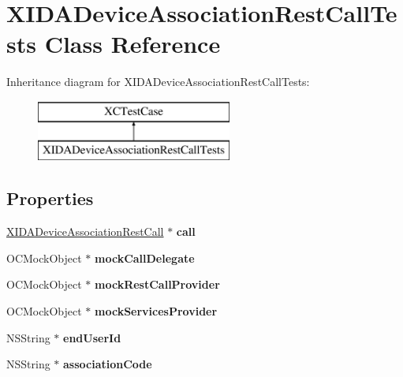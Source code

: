 \hypertarget{interface_x_i_d_a_device_association_rest_call_tests}{}\section{X\+I\+D\+A\+Device\+Association\+Rest\+Call\+Tests Class Reference}
\label{interface_x_i_d_a_device_association_rest_call_tests}
Inheritance diagram for X\+I\+D\+A\+Device\+Association\+Rest\+Call\+Tests\+:\begin{figure}[H]
\begin{center}
\leavevmode
\includegraphics[height=2.000000cm]{interface_x_i_d_a_device_association_rest_call_tests}
\end{center}
\end{figure}
\subsection*{Properties}
\begin{DoxyCompactItemize}
\item 
\hypertarget{interface_x_i_d_a_device_association_rest_call_tests_ac5ecd37ae1725d9f8649760bc7f407dc}{}\label{interface_x_i_d_a_device_association_rest_call_tests_ac5ecd37ae1725d9f8649760bc7f407dc} 
\hyperlink{interface_x_i_d_a_device_association_rest_call}{X\+I\+D\+A\+Device\+Association\+Rest\+Call} $\ast$ {\bfseries call}
\item 
\hypertarget{interface_x_i_d_a_device_association_rest_call_tests_a757dd87dff3ae3c88734c4844ad99baa}{}\label{interface_x_i_d_a_device_association_rest_call_tests_a757dd87dff3ae3c88734c4844ad99baa} 
O\+C\+Mock\+Object $\ast$ {\bfseries mock\+Call\+Delegate}
\item 
\hypertarget{interface_x_i_d_a_device_association_rest_call_tests_aae3626fd59d1564563d21fe7a61479f0}{}\label{interface_x_i_d_a_device_association_rest_call_tests_aae3626fd59d1564563d21fe7a61479f0} 
O\+C\+Mock\+Object $\ast$ {\bfseries mock\+Rest\+Call\+Provider}
\item 
\hypertarget{interface_x_i_d_a_device_association_rest_call_tests_a58858ed996bc636ff948498c8ac4beb5}{}\label{interface_x_i_d_a_device_association_rest_call_tests_a58858ed996bc636ff948498c8ac4beb5} 
O\+C\+Mock\+Object $\ast$ {\bfseries mock\+Services\+Provider}
\item 
\hypertarget{interface_x_i_d_a_device_association_rest_call_tests_aea2d0434672cae9152e4a18734f39d34}{}\label{interface_x_i_d_a_device_association_rest_call_tests_aea2d0434672cae9152e4a18734f39d34} 
N\+S\+String $\ast$ {\bfseries end\+User\+Id}
\item 
\hypertarget{interface_x_i_d_a_device_association_rest_call_tests_aada66b75d15aa37ef1df9db5455c0055}{}\label{interface_x_i_d_a_device_association_rest_call_tests_aada66b75d15aa37ef1df9db5455c0055} 
N\+S\+String $\ast$ {\bfseries association\+Code}
\end{DoxyCompactItemize}


